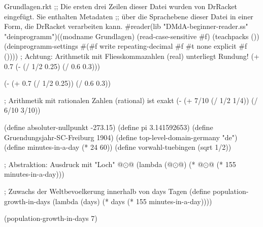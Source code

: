 \begin{filecontents*}{Grundlagen.rkt}
;; Die ersten drei Zeilen dieser Datei wurden von DrRacket eingefügt. Sie enthalten Metadaten
;; über die Sprachebene dieser Datei in einer Form, die DrRacket verarbeiten kann.
#reader(lib "DMdA-beginner-reader.ss" "deinprogramm")((modname Grundlagen) (read-case-sensitive #f) (teachpacks ()) (deinprogramm-settings #(#f write repeating-decimal #f #t none explicit #f ())))
; Achtung: Arithmetik mit Fliesskommazahlen (real)
unterliegt Rundung!
(+ 0.7
(- (/ 1/2 0.25)
(/ 0.6 0.3)))

(- (+ 0.7
(/ 1/2 0.25))
(/ 0.6 0.3))

; Arithmetik mit rationalen Zahlen (rational) ist exakt
(- (+ 7/10
(/ 1/2 1/4))
(/ 6/10 3/10))

(define absoluter-nullpunkt -273.15)
(define pi 3.141592653)
(define Gruendungsjahr-SC-Freiburg 1904)
(define top-level-domain-germany "de")
(define minutes-in-a-day (* 24 60))
(define vorwahl-tuebingen (sqrt 1/2))

; Abstraktion: Ausdruck mit "Loch" @$\odot$@
(lambda (@$\odot$@) (* @$\odot$@ (* 155 minutes-in-a-day)))


; Zuwachs der Weltbevoelkerung innerhalb von days Tagen
(define population-growth-in-days
(lambda (days) (* days (* 155 minutes-in-a-day))))

(population-growth-in-days 7)
\end{filecontents*}
